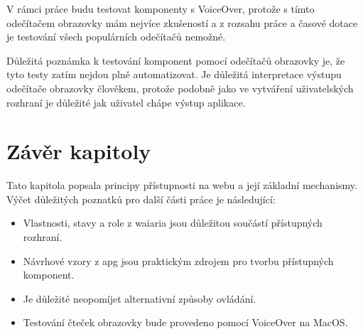V rámci práce budu testovat komponenty s VoiceOver, protože s tímto odečítačem obrazovky mám nejvíce zkušeností a z rozsahu práce a časové dotace je testování všech populárních odečítačů nemožné.

Důležitá poznámka k testování komponent pomocí odečítačů obrazovky je, že tyto testy zatím nejdou plně automatizovat.
Je důležitá interpretace výstupu odečítače obrazovky člověkem, protože podobně jako ve vytváření uživatelských rozhraní je důležité jak uživatel chápe výstup aplikace.

\section{Závěr kapitoly}

Tato kapitola popsala principy přístupnosti na webu a její základní mechanismy.
Výčet důležitých poznatků pro další části práce je následující:

\begin{itemize}
    \item Vlastnosti, stavy a role z \gls{waiaria} jsou důležitou součástí přístupných rozhraní.
    \item Návrhové vzory z \gls{apg} jsou praktickým zdrojem pro tvorbu přístupných komponent.
    \item Je důležité neopomíjet alternativní způsoby ovládání.
    \item Testování čteček obrazovky bude provedeno pomocí VoiceOver na MacOS.
\end{itemize}

